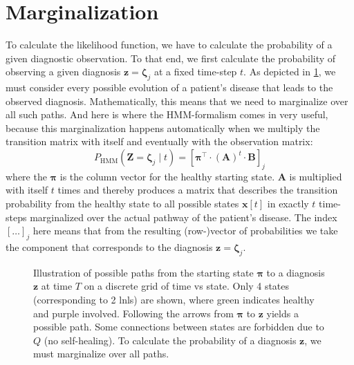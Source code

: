 \documentclass[\relativeRoot/main.tex]{subfiles}
\begin{document}
\section{Marginalization}
\label{sec:unilateral:marginalization}

To calculate the likelihood function, we have to calculate the probability of a given diagnostic observation. To that end, we first calculate the probability of observing a given diagnosis $\mathbf{z} = \boldsymbol{\zeta}_j$ at a fixed time-step $t$. As depicted in \cref{fig:unilateral:hmm_paths}, we must consider every possible evolution of a patient's disease that leads to the observed diagnosis. Mathematically, this means that we need to marginalize over all such paths. And here is where the HMM-formalism comes in very useful, because this marginalization happens automatically when we multiply the transition matrix with itself and eventually with the observation matrix:
%
\begin{equation} \label{eq:unilateral:marginalization:cond_time}
    P_\text{HMM} \left( \mathbf{Z} = \boldsymbol{\zeta}_j \mid t \right) = \left[ \boldsymbol{\pi}^\top \cdot (\mathbf{A})^t \cdot \mathbf{B} \right]_j
\end{equation}
%
where the $\boldsymbol{\pi}$ is the column vector for the healthy starting state. $\mathbf{A}$ is multiplied with itself $t$ times and thereby produces a matrix that describes the transition probability from the healthy state to all possible states $\mathbf{x}[t]$ in exactly $t$ time-steps marginalized over the actual pathway of the patient's disease. The index $[\ldots]_j$ here means that from the resulting (row-)vector of probabilities we take the component that corresponds to the diagnosis $\mathbf{z} = \boldsymbol{\zeta}_j$.

\begin{figure}
    \centering
    \def\svgwidth{0.9\textwidth}
    
    \caption{Illustration of possible paths from the starting state $\boldsymbol{\pi}$ to a diagnosis $\mathbf{z}$ at time $T$ on a discrete grid of time vs state. Only 4 states (corresponding to 2 \glspl{lnl}) are shown, where green indicates healthy and purple involved. Following the arrows from $\boldsymbol{\pi}$ to $\mathbf{z}$ yields a possible path. Some connections between states are forbidden due to $Q$ (no self-healing). To calculate the probability of a diagnosis $\mathbf{z}$, we must marginalize over all paths.}
    \label{fig:unilateral:hmm_paths}
\end{figure}
\end{document}
